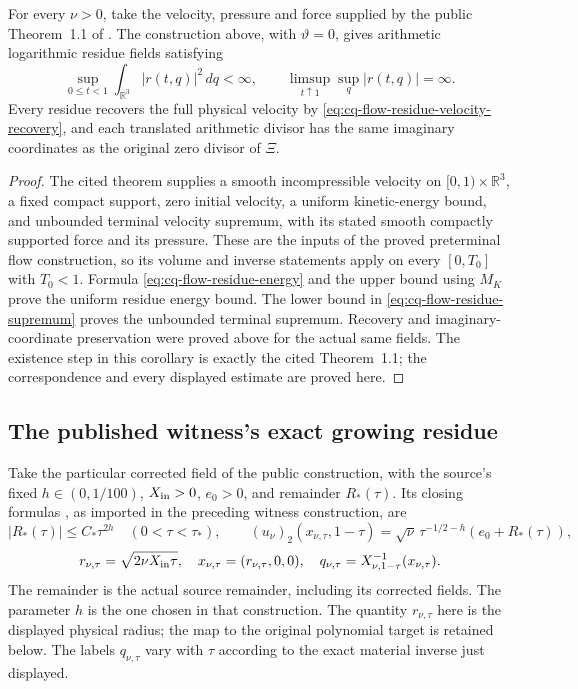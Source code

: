 \begin{cqproposition}
For every $\nu>0$, take the velocity, pressure and force supplied by
the public Theorem~1.1 of \cite{cqNS2026}. The construction above,
with $\vartheta=0$, gives arithmetic logarithmic residue fields
satisfying
\[
 \sup_{0\leq t<1}\int_{\mathbb R^3}|r(t,q)|^2\,dq<\infty,
 \qquad
 \limsup_{t\uparrow1}\sup_q|r(t,q)|=\infty .
\]
Every residue recovers the full physical velocity by
\eqref{eq:cq-flow-residue-velocity-recovery}, and each translated
arithmetic divisor has the same imaginary coordinates as the
original zero divisor of $\Xi$.
\end{cqproposition}
\begin{proof}
The cited theorem supplies a smooth incompressible velocity on
$[0,1)\times\mathbb R^3$, a fixed compact support, zero initial
velocity, a uniform kinetic-energy bound, and unbounded terminal
velocity supremum, with its stated smooth compactly supported force
and its pressure. These are the inputs of the proved preterminal
flow construction, so its volume and inverse statements apply
on every $[0,T_0]$ with $T_0<1$. Formula
\eqref{eq:cq-flow-residue-energy} and the upper bound using $M_K$
prove the uniform residue energy bound. The lower bound in
\eqref{eq:cq-flow-residue-supremum} proves the unbounded terminal
supremum. Recovery and imaginary-coordinate preservation were
proved above for the actual same fields. The existence step in
this corollary is exactly the cited Theorem~1.1; the correspondence
and every displayed estimate are proved here.
\end{proof}

\subsection{The published witness's exact growing residue}

Take the particular corrected field of the public construction, with
the source's fixed $h\in(0,1/100)$, $X_{\rm in}>0$, $e_0>0$,
and remainder $R_*(\tau)$. Its closing formulas
\cite[equations (10.20)--(10.22), p.~124]{cqNS2026}, as imported
in the preceding witness construction, are
\[
 |R_*(\tau)|\leq C_*\tau^{2h}\quad(0<\tau<\tau_*),\qquad
 (u_\nu)_2(x_{\nu,\tau},1-\tau)
   =\sqrt\nu\,\tau^{-1/2-h}(e_0+R_*(\tau)),
\]
\[
 r_{\nu,\tau}=\sqrt{2\nu X_{\rm in}\tau},\quad
 x_{\nu,\tau}=(r_{\nu,\tau},0,0),\quad
 q_{\nu,\tau}=X_{\nu,1-\tau}^{-1}(x_{\nu,\tau}).
\]
The remainder is the actual source remainder, including its corrected
fields. The parameter $h$ is the one chosen in that construction.
The quantity $r_{\nu,\tau}$ here is the displayed physical radius;
the map to the original polynomial target is retained below.
The labels $q_{\nu,\tau}$ vary with $\tau$ according to the exact
material inverse just displayed.

